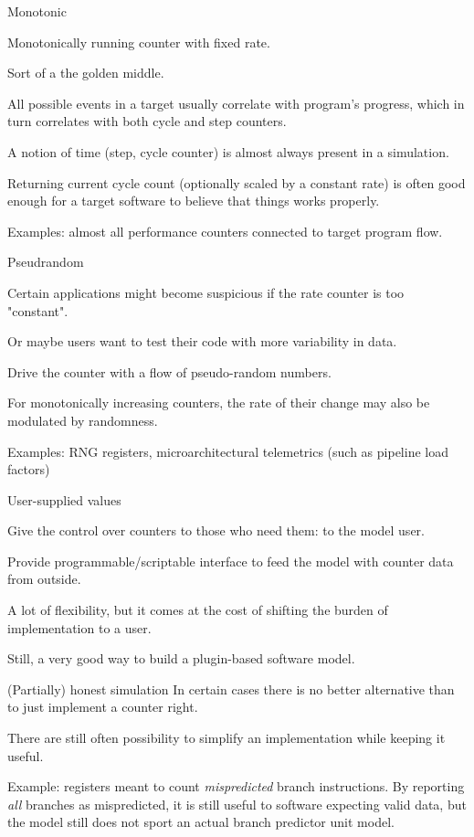\begin{frame}{Monotonic}

Monotonically running counter with fixed rate. 

Sort of a the golden middle. 

All possible events in a target usually correlate with program's progress, which in turn correlates
with both cycle and step counters.

A notion of time (step, cycle counter) is almost always present in a simulation.
  
Returning current cycle count (optionally scaled by a constant rate) is often good enough for a target software to believe that
things works properly.

Examples: almost all performance counters connected to target program flow.  
  
\end{frame}
  
\begin{frame}{Pseudrandom}

Certain applications might become suspicious if the rate counter is too "constant". 

Or maybe users want to test their code with more variability in data. 

Drive the counter with a flow of pseudo-random numbers.

For monotonically increasing counters, the rate of their change may also be
modulated by randomness.
  
Examples: RNG registers, microarchitectural telemetrics (such as pipeline load factors)

\end{frame}
  
\begin{frame}{User-supplied values}

Give the control over counters to those who need them: to the model user.

Provide programmable/scriptable interface to feed the model with counter data from outside.

A lot of flexibility, but it comes at the cost of shifting the burden of implementation to a user.

Still, a very good way to build a plugin-based software model.

\end{frame}

\begin{frame}{(Partially) honest simulation}
In certain cases there is no better alternative than to just implement a counter right. 

There are still often possibility to simplify an implementation while keeping it useful.
  
Example: registers meant to count \textit{mispredicted} branch instructions.
By reporting \textit{all} branches as mispredicted, it is still useful to software expecting
valid data, but the model still does not sport an actual branch predictor unit model.

\end{frame}
  
